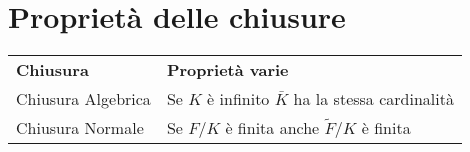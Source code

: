 \documentclass[a4paper,NoNotes,GeneralMath]{stdmdoc}
\begin{document}
	\section*{Proprietà delle chiusure}
	\begin{tabular}{ll}
	{\bf Chiusura} & {\bf Proprietà varie} \\
	Chiusura Algebrica & Se $K$ è infinito $\bar{K}$ ha la stessa cardinalità \\
	Chiusura Normale & Se $F/K$ è finita anche $\tilde{F}/K$ è finita \\
	\end{tabular} \vskip 1cm
\end{document}
